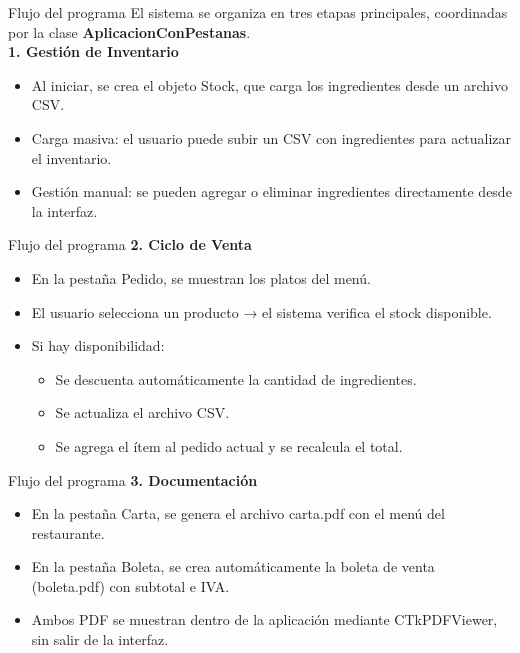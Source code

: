 \documentclass{beamer}
\begin{document}
\begin{frame}{Flujo del programa}
El sistema se organiza en tres etapas principales, coordinadas por la clase \textbf{AplicacionConPestanas}.\\
\vfill
\textbf{1. Gestión de Inventario}
\begin{itemize}
    \item Al iniciar, se crea el objeto Stock, que carga los ingredientes desde un archivo CSV.
    \item Carga masiva: el usuario puede subir un CSV con ingredientes para actualizar el inventario.
    \item Gestión manual: se pueden agregar o eliminar ingredientes directamente desde la interfaz.
\end{itemize}
\end{frame}

\begin{frame}{Flujo del programa}
\textbf{2. Ciclo de Venta}
\begin{itemize}
\item En la pestaña Pedido, se muestran los platos del menú.
\item El usuario selecciona un producto → el sistema verifica el stock disponible.
\item Si hay disponibilidad:
    \begin{itemize}
        \item Se descuenta automáticamente la cantidad de ingredientes.
        \item Se actualiza el archivo CSV.
        \item Se agrega el ítem al pedido actual y se recalcula el total.
     \end{itemize}
\end{itemize}
\end{frame}

\begin{frame}{Flujo del programa}
\textbf{3. Documentación}
\begin{itemize}
    \item En la pestaña Carta, se genera el archivo carta.pdf con el menú del restaurante.

    \item En la pestaña Boleta, se crea automáticamente la boleta de venta (boleta.pdf) con subtotal e IVA.

    \item  Ambos PDF se muestran dentro de la aplicación mediante CTkPDFViewer, sin salir de la interfaz.
\end{itemize}
\end{frame}
\end{document}

